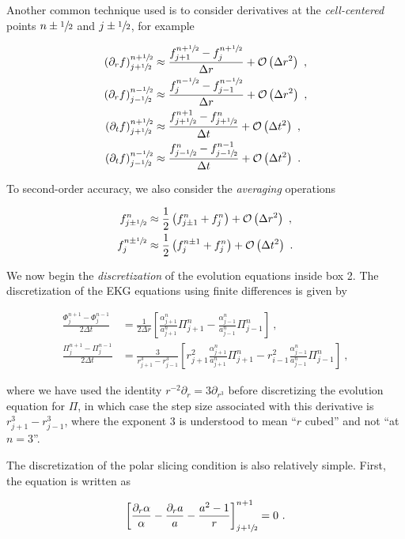 \documentclass[a4paper,11pt]{article}
\renewcommand{\a}{\alpha}
\newcommand{\pd}{\partial}
\newcommand{\dt}{\Delta t}
\newcommand{\dr}{\Delta r}
\newcommand{\order}[2]{\mathcal{O}\lrpar{#1^{#2}}}
\newcommand{\lrpar}[1]{\left( #1 \right)}
\newcommand{\lrsquare}[1]{\left[ #1 \right]}
\newcommand{\n}{\noindent}
\newcommand{\eq}[1]{
  \begin{equation}
    #1
  \end{equation}
}
\newcommand{\spl}[1]{
  \begin{split}
    #1
  \end{split}
}
\newcommand{\al}[1]{
  \begin{align}
    #1
  \end{align}
}
\begin{document}
\n Another common technique used is to consider derivatives at the \emph{cell-centered} points $n\pm\sfrac{1}{2}$ and $j\pm\sfrac{1}{2}$, for example

\eq{
  \spl{
    \lrpar{\pd_{r}f}^{n+\sfrac{1}{2}}_{j+\sfrac{1}{2}} &\approx \frac{f^{n+\sfrac{1}{2}}_{j+1} - f^{n+\sfrac{1}{2}}_{j}}{\dr} + \order{\dr}{2}\ ,\\
    \lrpar{\pd_{r}f}^{n-\sfrac{1}{2}}_{j-\sfrac{1}{2}} &\approx \frac{f^{n-\sfrac{1}{2}}_{j} - f^{n-\sfrac{1}{2}}_{j-1}}{\dr} + \order{\dr}{2}\ ,\\
    \lrpar{\pd_{t}f}^{n+\sfrac{1}{2}}_{j+\sfrac{1}{2}} &\approx \frac{f^{n+1}_{j+\sfrac{1}{2}} - f^{n}_{j+\sfrac{1}{2}}}{\dt} + \order{\dt}{2}\ ,\\
    \lrpar{\pd_{t}f}^{n-\sfrac{1}{2}}_{j-\sfrac{1}{2}} &\approx \frac{f^{n}_{j-\sfrac{1}{2}} - f^{n-1}_{j-\sfrac{1}{2}}}{\dt} + \order{\dt}{2}\ .
  }
}

To second-order accuracy, we also consider the \emph{averaging} operations

\eq{
  \spl{
    f^{n}_{j\pm\sfrac{1}{2}} &\approx \frac{1}{2}\lrpar{f^{n}_{j\pm1} + f^{n}_{j}} + \order{\dr}{2}\ ,\\
    f^{n\pm\sfrac{1}{2}}_{j} &\approx \frac{1}{2}\lrpar{f^{n\pm1}_{j} + f^{n}_{j}} + \order{\dt}{2}\ .
  }
}

We now begin the \emph{discretization} of the evolution equations inside box 2. The discretization of the EKG equations using finite differences is given by

\al{
  \frac{\Phi^{n+1}_{j} - \Phi^{n-1}_{j}}{2\dt} &= \frac{1}{2\dr}\lrsquare{\frac{\a^{n}_{j+1}}{a^{n}_{j+1}}\Pi^{n}_{j+1} - \frac{\a^{n}_{j-1}}{a^{n}_{j-1}}\Pi^{n}_{j-1}}\ ,\\
  \frac{\Pi^{n+1}_{j}  - \Pi^{n-1}_{j}}{2\dt}  &= \frac{3}{r_{j+1}^{3} - r_{j-1}^{3}}\lrsquare{r^{2}_{j+1}\frac{\a^{n}_{j+1}}{a^{n}_{j+1}}\Pi^{n}_{j+1} - r^{2}_{i-1}\frac{\a^{n}_{j-1}}{a^{n}_{j-1}}\Pi^{n}_{j-1}}\ ,
}

\noindent where we have used the identity $r^{-2}\pd_{r} = 3\pd_{r^{3}}$ before discretizing the evolution equation for $\Pi$, in which case the step size associated with this derivative is $r^{3}_{j+1} - r^{3}_{j-1}$, where the exponent $3$ is understood to mean ``$r$ cubed'' and not ``at $n=3$''.

The discretization of the polar slicing condition is also relatively simple. First, the equation is written as

\eq{ \lrsquare{\frac{\pd_{r}\a}{\a} - \frac{\pd_{r}a}{a} - \frac{a^{2}-1}{r}}^{n+1}_{j+\sfrac{1}{2}} = 0\ .}
\end{document}
